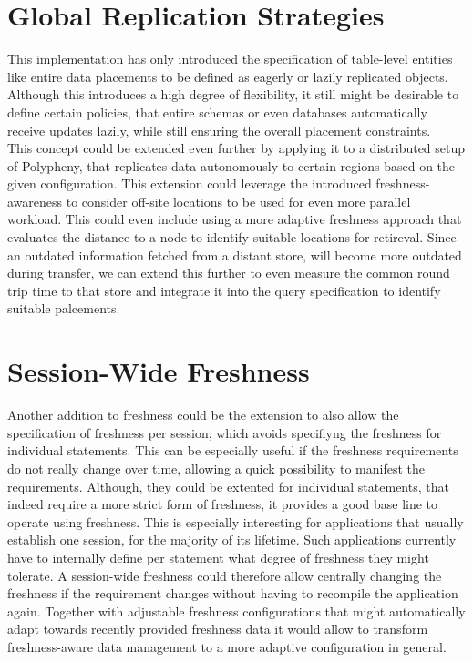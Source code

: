 \section{Global Replication Strategies}
This implementation has only introduced the specification of table-level entities like entire data placements to be defined as eagerly or lazily replicated objects.
Although this introduces a high degree of flexibility, it still might be desirable to define certain policies, that entire schemas or even databases automatically 
receive updates lazily, while still ensuring the overall placement constraints.\\
This concept could be extended even further by applying it to a distributed setup of Polypheny, that replicates data autonomously to certain regions based on the given 
configuration. 
This extension could leverage the introduced freshness-awareness to consider off-site locations to be used for even more parallel workload.
This could even include using a more adaptive freshness approach that evaluates the distance to a node to identify suitable locations for retireval.
Since an outdated information fetched from a distant store, will become more outdated during transfer, we can
extend this further to even measure the common round trip time to that store and integrate it into the query specification to identify suitable palcements.







\section{Session-Wide Freshness}
Another addition to freshness could be the extension to also allow the specification
of freshness per session, which avoids specifiyng the freshness for individual statements.
This can be especially useful if the freshness requirements do not really change over time, allowing a quick
possibility to manifest the requirements. Although, they could be extented for individual statements,
that indeed require a more strict form of freshness, it provides a good base line to operate using freshness.
This is especially interesting for applications that usually establish one session, for the majority of its lifetime. 
Such applications currently have to internally define per statement what degree of freshness they might tolerate. 
A session-wide freshness could therefore allow centrally changing the freshness if the requirement changes without having to recompile the application again.
Together with adjustable freshness configurations that might automatically adapt towards recently provided freshness data it would allow
to transform freshness-aware data management to a more adaptive configuration in general.


